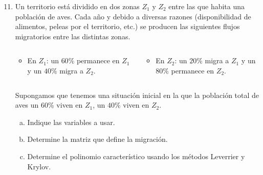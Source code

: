 \begin{frame}
	\begin{enumerate}\setcounter{enumi}{10}
		\item

		      Un territorio está dividido en dos zonas $Z_{1}$ y
		      $Z_{2}$ entre las que habita una población de aves.
		      Cada año y debido a diversas razones (disponibilidad de
		      alimentos, peleas por el territorio, etc.) se producen
		      las siguientes flujos migratorios entre las distintas
		      zonas.

		      \begin{columns}
			      \begin{column}{0.48\textwidth}
				      \begin{itemize}
					      \item

					            En $Z_{1}$: un $60$\% permanece en $Z_{1}$
					            y un $40$\% migra a $Z_{2}$.
				      \end{itemize}
			      \end{column}
			      \begin{column}{0.48\textwidth}
				      \begin{itemize}
					      \item

					            En $Z_{2}$: un $20$\% migra a $Z_{1}$ y un
					            $80$\% permanece en $Z_{2}$.
				      \end{itemize}
			      \end{column}
		      \end{columns}

		      Supongamos que tenemos una situación inicial en la que la
		      población total de aves un $60$\% viven en $Z_{1}$, un
		      $40$\% viven en $Z_{2}$.

		      \begin{enumerate}[a)]
			      \item

			            Indique las variables a usar.

			      \item

			            Determine la matriz que define la migración.

			      \item

			            Determine el polinomio característico usando los
			            métodos Leverrier y Krylov.


\end{enumerate}
\end{enumerate}
\end{frame}
